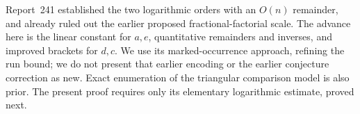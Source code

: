 Report~241 \cite{report241} established the two logarithmic orders with an $O(n)$ remainder, and already ruled out the earlier proposed fractional-factorial scale. The advance here is the linear constant for $a,e$, quantitative remainders and inverses, and improved brackets for $d,c$. We use its marked-occurrence approach, refining the run bound; we do not present that earlier encoding or the earlier conjecture correction as new. Exact enumeration of the triangular comparison model is also prior. The present proof requires only its elementary logarithmic estimate, proved next.
